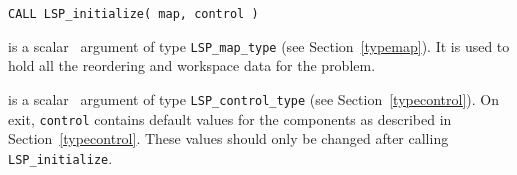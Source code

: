 \documentclass{galahad}
\newcommand{\packagename}{LSP}
\begin{document}
\hspace{8mm}
{\tt CALL \packagename\_initialize( map, control )}

\vspace*{-2mm}
\begin{description}

 is a scalar \intentout\ argument of type 
{\tt \packagename\_map\_type} (see Section~\ref{typemap}). 
It is used to hold all the reordering and workspace data for the problem. 

 is a scalar \intentout\ argument of type 
{\tt \packagename\_control\_type}
(see Section~\ref{typecontrol}). 
On exit, {\tt control} contains default values for the components as
described in Section~\ref{typecontrol}.
These values should only be changed after calling 
{\tt \packagename\_initialize}.

\end{description}

\end{document}
